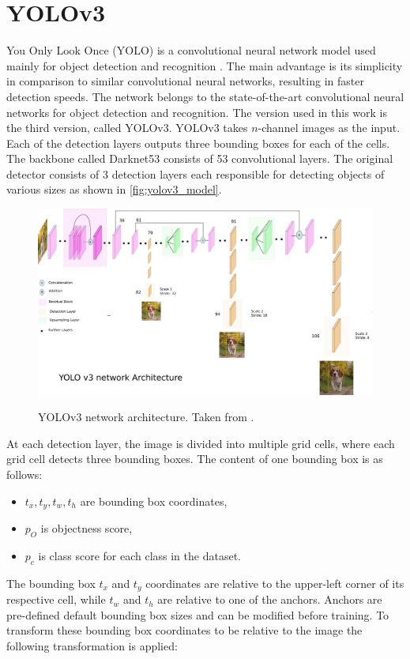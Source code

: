 \documentclass[twoside]{ctuthesis}
\theoremstyle{plain}
\theoremstyle{definition}
\theoremstyle{note}
\begin{document}
\section{YOLOv3} \label{s:2.2}
You Only Look Once (YOLO) is a convolutional neural network model used mainly for object detection and recognition \cite{redmon2016look}. The main advantage is its simplicity in comparison to similar convolutional neural networks, resulting in faster detection speeds. The network belongs to the state-of-the-art convolutional neural networks for object detection and recognition. The version used in this work is the third version, called YOLOv3\cite{redmon2018yolov3}. YOLOv3 takes $n$-channel images as the input. Each of the detection layers outputs three bounding boxes for each of the cells. The backbone called Darknet53 consists of 53 convolutional layers. The original detector consists of 3 detection layers each responsible for detecting objects of various sizes as shown in \autoref{fig:yolov3_model}. 
\begin{figure}
	\caption[YOLOv3 network architecture.]{YOLOv3 network architecture. Taken from \cite{kathuria_2018}.}
	\centering
	\includegraphics[width=\textwidth]{yolov3_model.png}
	\label{fig:yolov3_model}
\end{figure}
At each detection layer, the image is divided into multiple grid cells, where each grid cell detects three bounding boxes. The content of one bounding box is as follows:
\begin{itemize}
	\item $t_x, t_y, t_w, t_h$ are bounding box coordinates,
	\item $p_O$ is objectness score,
	\item $p_c$ is class score for each class in the dataset.
\end{itemize}
The bounding box $t_x$ and $t_y$ coordinates are relative to the upper-left corner of its respective cell, while $t_w$ and $t_h$ are relative to one of the anchors. Anchors are pre-defined default bounding box sizes and can be modified before training. To transform these bounding box coordinates to be relative to the image the following transformation is applied:
\end{document}
